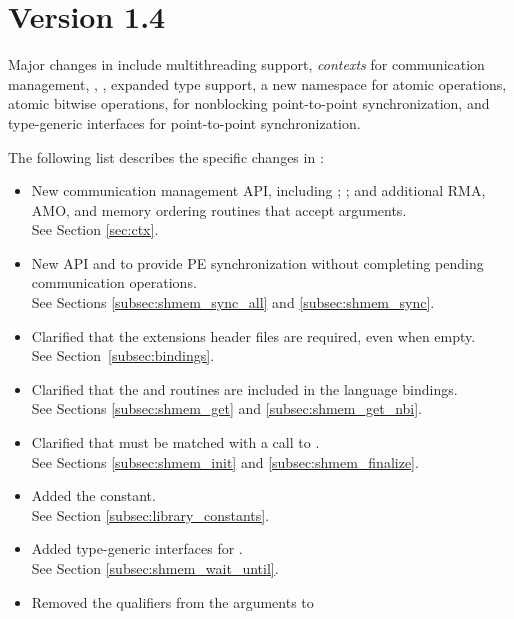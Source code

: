 \section{Version 1.4}
Major changes in \openshmem[1.4] include
multithreading support,
\emph{contexts} for communication management,
,
,
expanded type support,
a new namespace for atomic operations,
atomic bitwise operations,
 for nonblocking point-to-point synchronization,
and \Cstd[11] type-generic interfaces for point-to-point synchronization.

The following list describes the specific changes in \openshmem[1.4]:
\begin{itemize}
%
\item New communication management API, including ;
    ; and additional RMA, AMO, and memory ordering
    routines that accept  arguments.
\\See Section \ref{sec:ctx}.
%
\item New API  and  to provide \ac{PE}
    synchronization without completing pending communication operations.
    \\See Sections \ref{subsec:shmem_sync_all} and \ref{subsec:shmem_sync}.
%
\item Clarified that the \openshmem extensions header files are required, even when empty.
\\See Section~\ref{subsec:bindings}.
%
\item Clarified that the  and 
    routines are included in the \Fortran language bindings.\\
    See Sections \ref{subsec:shmem_get} and \ref{subsec:shmem_get_nbi}.
%
\item Clarified that  must be matched with a call to
    .
\\See Sections \ref{subsec:shmem_init} and \ref{subsec:shmem_finalize}.
%
\item Added the  constant.
\\See Section \ref{subsec:library_constants}.
%
\item Added type-generic interfaces for .
\\ See Section \ref{subsec:shmem_wait_until}.
%
\item Removed the  qualifiers from the  arguments to

\end{itemize}
